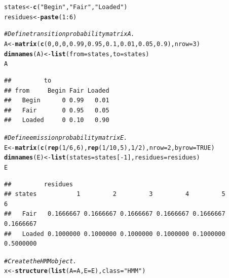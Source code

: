 \documentclass{article}\usepackage[]{graphicx}\usepackage[]{color}
\makeatletter
\newcommand{\hlnum}[1]{\textcolor[rgb]{0.686,0.059,0.569}{#1}}%
\newcommand{\hlstr}[1]{\textcolor[rgb]{0.192,0.494,0.8}{#1}}%
\newcommand{\hlcom}[1]{\textcolor[rgb]{0.678,0.584,0.686}{\textit{#1}}}%
\newcommand{\hlopt}[1]{\textcolor[rgb]{0,0,0}{#1}}%
\newcommand{\hlstd}[1]{\textcolor[rgb]{0.345,0.345,0.345}{#1}}%
\newcommand{\hlkwb}[1]{\textcolor[rgb]{0.69,0.353,0.396}{#1}}%
\newcommand{\hlkwc}[1]{\textcolor[rgb]{0.333,0.667,0.333}{#1}}%
\newcommand{\hlkwd}[1]{\textcolor[rgb]{0.737,0.353,0.396}{\textbf{#1}}}%
\newenvironment{kframe}{%
 \def\at@end@of@kframe{}%
 \ifinner\ifhmode%
  \def\at@end@of@kframe{\end{minipage}}%
  \begin{minipage}{\columnwidth}%
 \fi\fi%
 \def\FrameCommand##1{\hskip\@totalleftmargin \hskip-\fboxsep
 \colorbox{shadecolor}{##1}\hskip-\fboxsep
     \hskip-\linewidth \hskip-\@totalleftmargin \hskip\columnwidth}%
 \MakeFramed {\advance\hsize-\width
   \@totalleftmargin\z@ \linewidth\hsize
   \@setminipage}}%
 {\par\unskip\endMakeFramed%
 \at@end@of@kframe}
\newenvironment{knitrout}{}{} %
\makeatother
\begin{document}
\begin{center}
\begin{knitrout}
\color{fgcolor}\begin{kframe}
\begin{alltt}
\hlstd{states} \hlkwb{<-} \hlkwd{c}\hlstd{(}\hlstr{"Begin"}\hlstd{,} \hlstr{"Fair"}\hlstd{,} \hlstr{"Loaded"}\hlstd{)}
\hlstd{residues} \hlkwb{<-} \hlkwd{paste}\hlstd{(}\hlnum{1}\hlopt{:}\hlnum{6}\hlstd{)}

\hlcom{# Define transition probability matrix A.}
\hlstd{A} \hlkwb{<-} \hlkwd{matrix}\hlstd{(}\hlkwd{c}\hlstd{(}\hlnum{0}\hlstd{,} \hlnum{0}\hlstd{,} \hlnum{0}\hlstd{,} \hlnum{0.99}\hlstd{,} \hlnum{0.95}\hlstd{,} \hlnum{0.1}\hlstd{,} \hlnum{0.01}\hlstd{,} \hlnum{0.05}\hlstd{,} \hlnum{0.9}\hlstd{),} \hlkwc{nrow} \hlstd{=} \hlnum{3}\hlstd{)}
\hlkwd{dimnames}\hlstd{(A)} \hlkwb{<-} \hlkwd{list}\hlstd{(}\hlkwc{from} \hlstd{= states,} \hlkwc{to} \hlstd{= states)}
\hlstd{A}
\end{alltt}
\begin{verbatim}
##         to
## from     Begin Fair Loaded
##   Begin      0 0.99   0.01
##   Fair       0 0.95   0.05
##   Loaded     0 0.10   0.90
\end{verbatim}
\begin{alltt}
\hlcom{# Define emission probability matrix E.}
\hlstd{E} \hlkwb{<-} \hlkwd{matrix}\hlstd{(}\hlkwd{c}\hlstd{(}\hlkwd{rep}\hlstd{(}\hlnum{1}\hlopt{/}\hlnum{6}\hlstd{,} \hlnum{6}\hlstd{),} \hlkwd{rep}\hlstd{(}\hlnum{1}\hlopt{/}\hlnum{10}\hlstd{,} \hlnum{5}\hlstd{),} \hlnum{1}\hlopt{/}\hlnum{2}\hlstd{),} \hlkwc{nrow} \hlstd{=} \hlnum{2}\hlstd{,} \hlkwc{byrow} \hlstd{=} \hlnum{TRUE}\hlstd{)}
\hlkwd{dimnames}\hlstd{(E)} \hlkwb{<-} \hlkwd{list}\hlstd{(}\hlkwc{states} \hlstd{= states[}\hlopt{-}\hlnum{1}\hlstd{],} \hlkwc{residues} \hlstd{= residues)}
\hlstd{E}
\end{alltt}
\begin{verbatim}
##         residues
## states           1         2         3         4         5         6
##   Fair   0.1666667 0.1666667 0.1666667 0.1666667 0.1666667 0.1666667
##   Loaded 0.1000000 0.1000000 0.1000000 0.1000000 0.1000000 0.5000000
\end{verbatim}
\begin{alltt}
\hlcom{# Create the HMM object.}
\hlstd{x} \hlkwb{<-} \hlkwd{structure}\hlstd{(}\hlkwd{list}\hlstd{(}\hlkwc{A} \hlstd{= A,} \hlkwc{E} \hlstd{= E),} \hlkwc{class} \hlstd{=} \hlstr{"HMM"}\hlstd{)}


\end{alltt}
\end{kframe}
\end{knitrout}
\end{center}
\end{document}
